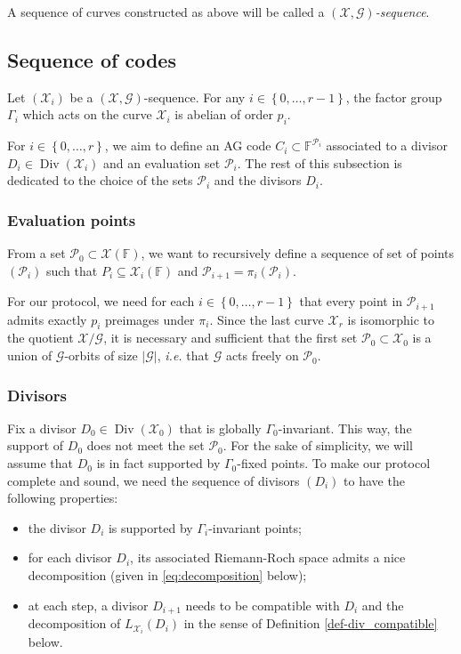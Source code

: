 \documentclass[10pt,a4paper]{article}
\newcommand\F{\mathbb{F}}
\DeclareMathOperator{\Div}{Div}
\renewcommand{\vec}[1]{\boldsymbol{#1}}
\newcommand{\set}[1]{\left\{#1\right\}}
\newcommand{\size}[1]{\left|#1\right|}
\newcommand{\range}[1]{\set{0,\dots,#1-1}}
\newcommand\calX{\mathcal{X}}
\newcommand\calP{\mathcal{P}}
\newcommand\calG{\mathcal{G}}
\newcommand\XGseq{(\calX, \vec{\calG})}
\theoremstyle{plain}
\theoremstyle{plain}
\theoremstyle{definition}
\theoremstyle{remark}
\theoremstyle{plain}
\begin{document}
\begin{definition}
	A sequence of curves constructed as above will be called a \emph{$\XGseq$-sequence}.
\end{definition}

\subsection{Sequence of codes}\label{subsubsec:def-codes}

Let $(\calX_i)$ be a $\XGseq$-sequence. For any $i \in \range{r}$, the factor group $\Gamma_i$ which acts on the curve $\calX_i$ is abelian of order $p_i$.

For $i \in \set{0, \dots, r}$, we aim to define an AG code $C_i \subset \F^{\calP_i}$ associated to a divisor $D_i \in \Div(\calX_i)$ and an evaluation set $\calP_i$. 
The rest of this subsection is dedicated to the choice of the sets $\calP_i$ and the divisors $D_i$.

\subsubsection{Evaluation points} From a set $\calP_0 \subset \calX(\F)$, we want to recursively define a sequence of set of points $(\calP_i)$ such that $P_i \subseteq \calX_i(\F)$ and $\calP_{i+1}=\pi_i(\calP_{i})$.

For our protocol, we need for each $i \in \range{r}$ that every point in $\calP_{i+1}$ admits exactly $p_i$ preimages under $\pi_i$. Since the last curve $\calX_r$ is isomorphic to the quotient $\calX / \calG$, it is necessary and sufficient that the first set $\calP_0 \subset \calX_0$ is a union of $\calG$-orbits of size $\size{\calG}$, \emph{i.e.} that $\calG$ acts freely on $\calP_0$.

\subsubsection{Divisors} Fix a divisor $D_0 \in \Div(\calX_0)$ that is globally $\Gamma_0$-invariant. This way, the support of $D_0$ does not meet the set $\calP_0$. For the sake of simplicity, we will assume that $D_0$ is in fact supported by $\Gamma_0$-fixed points. To make our protocol complete and sound, we need the sequence of divisors $(D_i)$ to have the following properties:
\begin{itemize}
    \item the divisor $D_i$ is supported by $\Gamma_i$-invariant points;
    \item for each divisor $D_i$, its associated Riemann-Roch space admits a nice decomposition (given in \eqref{eq:decomposition} below);
    \item at each step, a divisor $D_{i+1}$ needs to be compatible with $D_i$ and the decomposition of $L_{\calX_i}(D_i)$ in the sense of Definition \ref{def-div_compatible} below.
\end{itemize}
\end{document}
